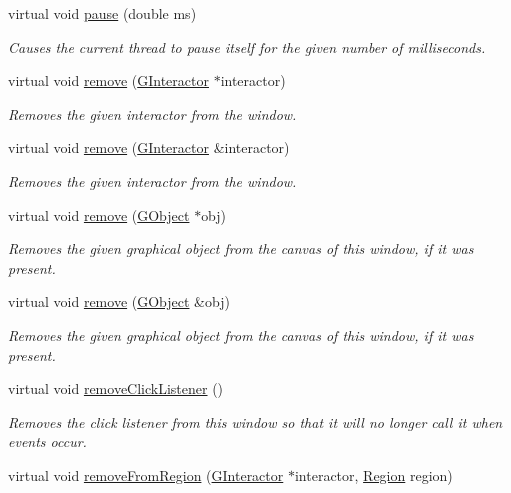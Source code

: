 \begin{DoxyCompactItemize}
virtual void \mbox{\hyperlink{classGWindow_adc7d99bb2dc43b8337e89b7d54cab9d3}{pause}} (double ms)
\begin{DoxyCompactList}\small\item\em Causes the current thread to pause itself for the given number of milliseconds. \end{DoxyCompactList}\item 
virtual void \mbox{\hyperlink{classGWindow_a1c12b1fde5c2ef10d79d4ee51e670efa}{remove}} (\mbox{\hyperlink{classGInteractor}{G\+Interactor}} $\ast$interactor)
\begin{DoxyCompactList}\small\item\em Removes the given interactor from the window. \end{DoxyCompactList}\item 
virtual void \mbox{\hyperlink{classGWindow_ade2376c458ac401a0bd2dbe44271509e}{remove}} (\mbox{\hyperlink{classGInteractor}{G\+Interactor}} \&interactor)
\begin{DoxyCompactList}\small\item\em Removes the given interactor from the window. \end{DoxyCompactList}\item 
virtual void \mbox{\hyperlink{classGWindow_afc8bff4a24e05c696cbe4cba7403e558}{remove}} (\mbox{\hyperlink{classGObject}{G\+Object}} $\ast$obj)
\begin{DoxyCompactList}\small\item\em Removes the given graphical object from the canvas of this window, if it was present. \end{DoxyCompactList}\item 
virtual void \mbox{\hyperlink{classGWindow_a37cf4a26853ac22c5e3a21335dfc7ac9}{remove}} (\mbox{\hyperlink{classGObject}{G\+Object}} \&obj)
\begin{DoxyCompactList}\small\item\em Removes the given graphical object from the canvas of this window, if it was present. \end{DoxyCompactList}\item 
virtual void \mbox{\hyperlink{classGWindow_ad39d0325cde6b97ebda4b9d7787c633b}{remove\+Click\+Listener}} ()
\begin{DoxyCompactList}\small\item\em Removes the click listener from this window so that it will no longer call it when events occur. \end{DoxyCompactList}\item 
virtual void \mbox{\hyperlink{classGWindow_a87a74b040025878283ba685e30d5104f}{remove\+From\+Region}} (\mbox{\hyperlink{classGInteractor}{G\+Interactor}} $\ast$interactor, \mbox{\hyperlink{classGWindow_a81a01a86de31071a92e6cce0bab9bc4b}{Region}} region)

\end{DoxyCompactItemize}
